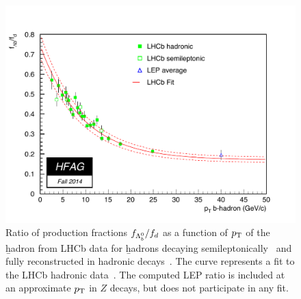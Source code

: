 \begin{figure}
 \begin{center}
  \includegraphics[width=\textwidth]{figures/life_mix/rlb_comb}
  \caption{Ratio of production fractions $f_{\Lambda_b^0}/f_{d}$ as 
   a function of $p_{\rm T}$ of the \b hadron from
   LHCb data for \b hadrons decaying semileptonically~\cite{Aaij:2011jp}
   and fully reconstructed in hadronic decays~\cite{Aaij:2014jyk}. 
   The curve represents a fit to the LHCb hadronic data~\cite{Aaij:2014jyk}.
   The computed LEP ratio is included at an approximate $p_{\rm T}$ 
   in $Z$ decays, but does not participate in any fit.}
 \end{center}
\end{figure}

